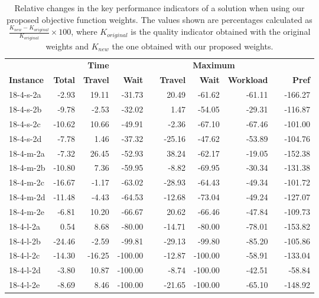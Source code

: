 \begin{table}[h]
\centering
\caption{Relative changes in the key performance indicators of a solution when using our proposed objective function weights. The values shown are percentages calculated as $\frac{K_{new} - K_{original}}{K_{original}}\times 100$, where $K_{original}$ is the quality indicator obtained with the original weights and $K_{new}$ the one obtained with our proposed weights.}
\scriptsize
\begin{tabular}{lrrrrrrrrr}
    \toprule
    & \multicolumn{3}{c}{\textbf{Time}} & \phantom{a}  & \multicolumn{3}{c}{\textbf{Maximum}} & &\\
    \cmidrule{2-4} \cmidrule{6-8}
    \textbf{Instance} & \textbf{Total} & \textbf{Travel} & \textbf{Wait} &  & \textbf{Travel} & \textbf{Wait} & \textbf{Workload} &&  \textbf{Pref}\\
    \midrule
    18-4-s-2a & -2.93 & 19.11 & -31.73 && 20.49 & -61.62 & -61.11 && -166.27 \\
    18-4-s-2b & -9.78 & -2.53 & -32.02 && 1.47 & -54.05 & -29.31 && -116.87 \\
    18-4-s-2c & -10.62 & 10.66 & -49.91 && -2.36 & -67.10 & -67.46 && -101.00 \\
    18-4-s-2d & -7.78 & 1.46 & -37.32 && -25.16 & -47.62 & -53.89 && -104.76 \\
    18-4-m-2a & -7.32 & 26.45 & -52.93 && 38.24 & -62.17 & -19.05 && -152.38 \\
    18-4-m-2b & -10.80 & 7.36 & -59.95 && -8.82 & -69.95 & -30.34 && -131.38 \\
    18-4-m-2c & -16.67 & -1.17 & -63.02 && -28.93 & -64.43 & -49.34 && -101.72 \\
    18-4-m-2d & -11.48 & -4.43 & -64.53 && -12.68 & -73.04 & -49.24 && -127.07 \\
    18-4-m-2e & -6.81 & 10.20 & -66.67 && 20.62 & -66.46 & -47.84 && -109.73 \\
    18-4-l-2a & 0.54 & 8.68 & -80.00 && -14.71 & -80.00 & -78.01 && -153.82 \\
    18-4-l-2b & -24.46 & -2.59 & -99.81 && -29.13 & -99.80 & -85.20 && -105.86 \\
    18-4-l-2c & -14.30 & -16.25 & -100.00 && -12.87 & -100.00 & -58.91 && -133.04 \\
    18-4-l-2d & -3.80 & 10.87 & -100.00 && -8.74 & -100.00 & -42.51 && -58.84 \\
    18-4-l-2e & -8.69 & 8.46 & -100.00 && -21.65 & -100.00 & -65.10 && -148.92 \\

\end{tabular}
\end{table}
